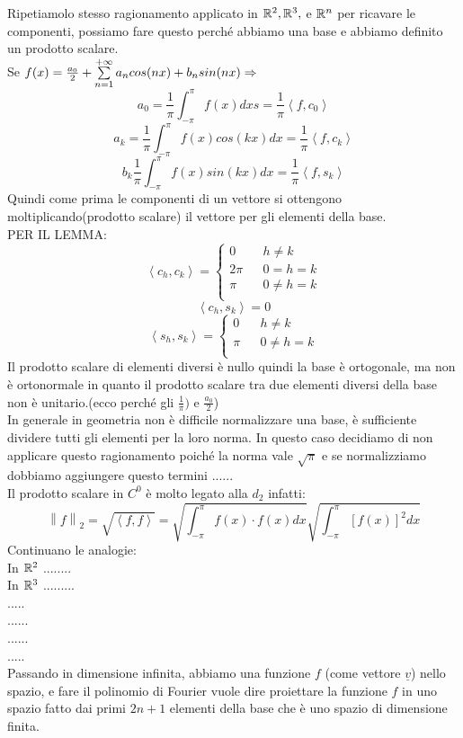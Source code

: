 Ripetiamolo stesso ragionamento applicato in $ \mathbb{R}^2, \mathbb{R}^3,$ e $ \mathbb{R}^n$ per ricavare le componenti, possiamo fare questo perché abbiamo una base e abbiamo definito un prodotto scalare.\\
Se $f(x)=\frac{a_0}{2}+\sum\limits_{n=1}^{+\infty}a_{n}cos(nx)+b_{n}sin(nx) \Rightarrow $
$$a_0=\frac{1}{\pi}\int_{-\pi}^{\pi}f(x)dxs=\frac{1}{\pi}\left<f,c_0\right> $$
$$a_k=\frac{1}{\pi}\int_{-\pi}^{\pi}f(x)cos(kx)dx=\frac{1}{\pi}\left<f,c_k\right> $$
$$b_k\frac{1}{\pi}\int_{-\pi}^{\pi}f(x)sin(kx)dx=\frac{1}{\pi}\left<f,s_k\right>$$
Quindi come prima le componenti di un vettore si ottengono moltiplicando(prodotto scalare) il vettore per gli elementi della base.\\
PER IL LEMMA:\\
$$
\left<c_h,c_k\right>=
\left\{\begin{matrix}
0&&h\ne k\\
2\pi&&0=h=k\\
\pi&&0\ne h=k\\
\end{matrix}\right.
$$
$$ \left<c_h,s_k\right>=0$$
$$
\left<s_h,s_k\right>=
\left\{\begin{matrix}
0&&h\ne k\\
\pi&&0\ne h=k\\
\end{matrix}\right.
$$
Il prodotto scalare di elementi diversi è nullo quindi la base è ortogonale, ma non è ortonormale in quanto il prodotto scalare tra due elementi diversi della base non è unitario.(ecco perché gli $\frac{1}{\pi})$ e $\frac{a_0}{2}$)\\
In generale in geometria non è difficile normalizzare una base, è sufficiente dividere tutti gli elementi per la loro norma. In questo caso decidiamo di non applicare questo ragionamento poiché la norma vale $\sqrt{\pi}$ e se normalizziamo dobbiamo aggiungere questo termini ......\\
Il prodotto scalare in $C^0$ è molto legato alla $d_2$ infatti:
$$\left\|f\right\|_2=\sqrt{\left<f,f\right>}=\sqrt{\int_{-\pi}^{\pi}f(x)\cdot f(x)dx}\sqrt{\int_{-\pi}^{\pi}\left[f(x)\right]^2dx}$$ 
Continuano le analogie:\\
In $ \mathbb{R}^2$ ........\\
In $ \mathbb{R}^3$ .........\\
.....\\
......\\
......\\
.....\\
Passando in dimensione infinita, abbiamo una funzione $f$ (come vettore $\underline{v}$) nello spazio, e fare il polinomio di Fourier  vuole dire proiettare la funzione $f$ in uno spazio fatto dai primi $2n+1$ elementi della base che è uno spazio di dimensione finita.\\
